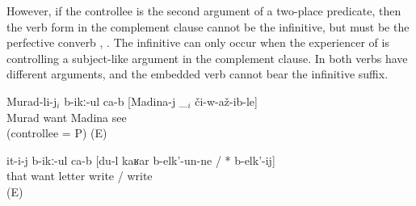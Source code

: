 However, if the controllee is the second argument of a two-place predicate, then the verb form in the complement clause cannot be the infinitive, but must be the perfective converb , . The infinitive can only occur when the experiencer of  is controlling a subject-like argument in the complement clause. In  both verbs have different arguments, and the embedded verb cannot bear the infinitive suffix.
%
\begin{exe}
	\ex	\label{ex:Murad, Madina, letter@45}
	\begin{xlist}
		\ex	\label{ex:Murad wants Madina to see him@45a}
		\gll	Murad-li-j$_{i}$	b-ikː-ul ca-b	[Madina-j	\_$_{i}$	či-w-až-ib-le]\\
			Murad	want 	 Madina		see\\
		\glt	{} (controllee = P) (E)

		\ex	\label{ex:He wants that I write the letter@45b}
		\gll	it-i-j	b-ikː-ul ca-b	[du-l	kaʁar 	b-elk'-un-ne	/ 	{*}	b-elk'-ij]\\
			that	want 		letter	write	/	{} write\\
		\glt	{} (E)
	\end{xlist}
\end{exe}

